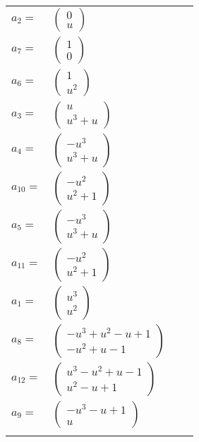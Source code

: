 \documentclass[1p]{elsarticle_modified}
\theoremstyle{definition}
\begin{document}
\begin{tabular}{m{7pt} m{180pt} m{7pt} m{180pt} }
\flushright $a_{2}=$&$\begin{pmatrix}0\\u\end{pmatrix}$ \\
\flushright $a_{7}=$&$\begin{pmatrix}1\\0\end{pmatrix}$ \\
\flushright $a_{6}=$&$\begin{pmatrix}1\\u^2\end{pmatrix}$ \\
\flushright $a_{3}=$&$\begin{pmatrix}u\\u^3+u\end{pmatrix}$ \\
\flushright $a_{4}=$&$\begin{pmatrix}- u^3\\u^3+u\end{pmatrix}$ \\
\flushright $a_{10}=$&$\begin{pmatrix}- u^2\\u^2+1\end{pmatrix}$ \\
\flushright $a_{5}=$&$\begin{pmatrix}- u^3\\u^3+u\end{pmatrix}$ \\
\flushright $a_{11}=$&$\begin{pmatrix}- u^2\\u^2+1\end{pmatrix}$ \\
\flushright $a_{1}=$&$\begin{pmatrix}u^3\\u^2\end{pmatrix}$ \\
\flushright $a_{8}=$&$\begin{pmatrix}- u^3+u^2- u+1\\- u^2+u-1\end{pmatrix}$ \\
\flushright $a_{12}=$&$\begin{pmatrix}u^3- u^2+u-1\\u^2- u+1\end{pmatrix}$ \\
\flushright $a_{9}=$&$\begin{pmatrix}- u^3- u+1\\u\end{pmatrix}$\\&\end{tabular}
\end{document}
